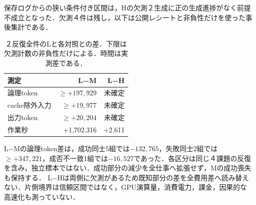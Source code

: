 保存ログからの狭い条件付き区間は，Hの欠測２生成に正の生成進捗がなく前提不成立となった．欠測４件は残し，以下は公開レシートと非負性だけを使った事後集計である．
\begin{table}[tb]
\centering\fontsize{8pt}{10pt}\selectfont\setlength{\tabcolsep}{3pt}
\caption{２反復全件のLと各対照との差．下限は欠測計数の非負性だけによる．時間は実測差である．}
\begin{tabular}{lrr}
測定 & L−M & L−H \\ \hline
論理token & $\geq +197,929$ & 未確定 \\
cache除外入力 & $\geq +19,977$ & 未確定 \\
出力token & $\geq +20,204$ & 未確定 \\
作業秒 & +1,702.316 & +2.611 \\
\hline\end{tabular}
\end{table}
L−Mの論理token差は，成功同士5組では$-132,765$，失敗同士2組では$\geq +347,221$，成否不一致1組では$-16,527$であった．各区分は同じ４課題の反復を含み，独立標本ではない．成功部分の減少を全仕事へ拡張せず，Mの成功喪失も保持する．
L−Hは両側に欠測があるため既知部分の差を全費用差へ読み替えない．片側境界は信頼区間ではなく，GPU演算量，消費電力，課金，因果的な高速化も測っていない．
